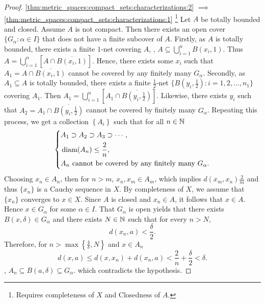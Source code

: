 \begin{proof}
\ref{thm:metric_spaces:compact_sets:characterizations:2} $\implies$ 
\ref{thm:metric_spaces:compact_sets:characterizations:1}
\footnote{Requires completeness of $X$ and Closedness of $A$.}
Let $A$ be totally bounded and closed. 
Assume $A$ is not compact. 
Then there exists an open cover $\{G_\alpha: \alpha \in I\}$ that does not 
have a finite subcover of $A$. 
Firstly, as $A$ is totally bounded, there exists a finite $1$-net 
covering $A$, \ie, $A \subseteq \bigcup_{i=1}^n B(x_i, 1)$. 
Thus $A = \bigcup_{i=1}^n \left[ A \cap \overline{B(x_i, 1)} \right]$. 
Hence, there exists some $x_i$ such that $A_1 = A \cap \overline{B(x_i, 1)}$ 
cannot be covered by any finitely many $G_\alpha$. 
Secondly, as $A_1 \subseteq A$ is totally bounded, there exists a finite 
$\frac{1}{2}$-net $\{B(y_i, \frac{1}{2}): i=1, 2, \ldots, n_1\}$ covering 
$A_1$. 
Then $A_1 = \bigcup_{i=1}^n \left[ A_1 \cap \overline{B(y_i, \frac{1}{2})} 
\right]$. 
Likewise, there exists $y_i$ such that 
$A_2 = A_1 \cap \overline{B(y_i, \frac{1}{2})}$ cannot be covered by 
finitely many $G_\alpha$. 
Repeating this process, we get a collection $\left\{ A_i \right\}$ 
such that for all $n \in \mathbb{N}$ 
\begin{equation*}
    \left\{
    \begin{aligned}
        & A_1 \supset A_2 \supset A_3 \supset \cdots,  \\
        &\operatorname{diam}(A_n) \le \frac{2}{n}, \\
        & A_n \text{ cannot be covered by any finitely many } G_\alpha. 
    \end{aligned}
    \right.
\end{equation*}
Choosing $x_n \in A_n$, then for $n > m$, $x_n, x_m \in A_m$, which implies 
$d(x_m, x_n) \frac{2}{m}$ and thus $\{x_n\}$ is a Cauchy sequence in $X$. 
By completeness of $X$, we assume that $\{x_n\}$ converges to $x \in X$. 
Since $A$ is closed and $x_n \in A$, it follows that $x \in A$. 
Hence $x \in G_\alpha$ for some $\alpha \in I$. 
That $G_\alpha$ is open yields that there exists $B(x, \delta) \in G_\alpha$ 
and there exists $N \in \mathbb{N}$ such that for every $n > N$, 
\begin{equation*}
    d(x_n, a) < \frac{\delta}{2}.
\end{equation*}
Therefore, for $n > \max \left\{ \frac{4}{\delta}, N \right\}$ and $x \in 
A_n$ 
\begin{equation*}
    d(x, a) \le d(x, x_n) + d(x_n, a) < \frac{2}{n} + \frac{\delta}{2} 
    < \delta. 
\end{equation*}
\ie, $A_n \subseteq B(a, \delta) \subseteq G_\alpha$. which contradicts the 
hypothesis. 
\end{proof}

